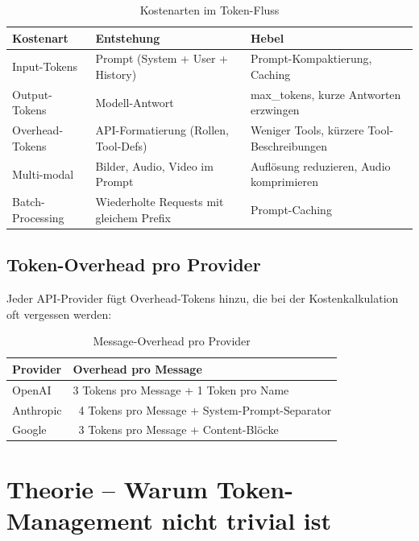\begin{table}[H]
\centering
\begin{tabularx}{\linewidth}{lXl}
\toprule
\textbf{Kostenart} & \textbf{Entstehung} & \textbf{Hebel} \\
\midrule
Input-Tokens & Prompt (System + User + History) & Prompt-Kompaktierung, Caching \\
Output-Tokens & Modell-Antwort & max\_tokens, kurze Antworten erzwingen \\
Overhead-Tokens & API-Formatierung (Rollen, Tool-Defs) & Weniger Tools, kürzere Tool-Beschreibungen \\
Multi-modal & Bilder, Audio, Video im Prompt & Auflösung reduzieren, Audio komprimieren \\
Batch-Processing & Wiederholte Requests mit gleichem Prefix & Prompt-Caching \\
\midrule
\end{tabularx}
\caption{Kostenarten im Token-Fluss}
\label{tab:kostenarten}
\end{table}

\subsection{Token-Overhead pro Provider}

Jeder API-Provider fügt Overhead-Tokens hinzu, die bei der Kostenkalkulation oft vergessen werden:

\begin{table}[H]
\centering
\begin{tabularx}{\linewidth}{lX}
\toprule
\textbf{Provider} & \textbf{Overhead pro Message} \\
\midrule
OpenAI & 3 Tokens pro Message + 1 Token pro Name \\
Anthropic & ~4 Tokens pro Message + System-Prompt-Separator \\
Google & ~3 Tokens pro Message + Content-Blöcke \\
\midrule
\end{tabularx}
\caption{Message-Overhead pro Provider}
\label{tab:overhead-provider}
\end{table}

\section{Theorie -- Warum Token-Management nicht trivial ist}


